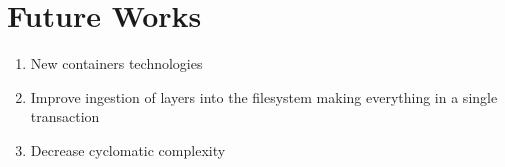 \chapter{Future Works}\label{ch:FutureWorks}

\begin{enumerate}
\item New containers technologies
\item Improve ingestion of layers into the filesystem making everything in a single transaction
\item Decrease cyclomatic complexity
\end{enumerate}
